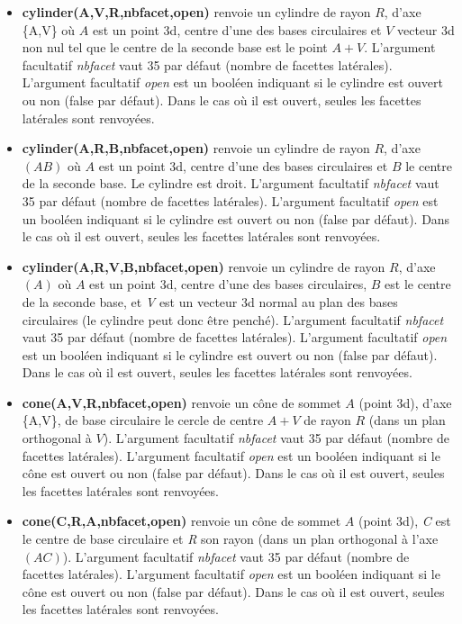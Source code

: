 \begin{itemize}
    \item \textbf{cylinder(A,V,R,nbfacet,open)} renvoie un cylindre de rayon $R$, d'axe \{A,V\} où $A$ est un point 3d, centre d'une des bases circulaires et $V$ vecteur 3d non nul tel que le centre de la seconde base est le point $A+V$. L'argument facultatif \emph{nbfacet} vaut 35 par défaut (nombre de facettes latérales). L'argument facultatif \emph{open} est un booléen indiquant si le cylindre est ouvert ou non (false par défaut). Dans le cas où il est ouvert, seules les facettes latérales sont renvoyées.
    
    \item \textbf{cylinder(A,R,B,nbfacet,open)} renvoie un cylindre de rayon $R$, d'axe $(AB)$ où $A$ est un point 3d, centre d'une des bases circulaires et $B$ le centre de la seconde base. Le cylindre est droit. L'argument facultatif \emph{nbfacet} vaut 35 par défaut (nombre de facettes latérales). L'argument facultatif \emph{open} est un booléen indiquant si le cylindre est ouvert ou non (false par défaut). Dans le cas où il est ouvert, seules les facettes latérales sont renvoyées.
    
   \item \textbf{cylinder(A,R,V,B,nbfacet,open)} renvoie un cylindre de rayon $R$, d'axe $(A)$ où $A$ est un point 3d, centre d'une des bases circulaires, $B$ est le centre de la seconde base, et \emph{V} est un vecteur 3d normal au plan des bases circulaires (le cylindre peut donc être penché). L'argument facultatif \emph{nbfacet} vaut 35 par défaut (nombre de facettes latérales). L'argument facultatif \emph{open} est un booléen indiquant si le cylindre est ouvert ou non (false par défaut). Dans le cas où il est ouvert, seules les facettes latérales sont renvoyées.
    
    \item \textbf{cone(A,V,R,nbfacet,open)} renvoie un cône de sommet $A$ (point 3d), d'axe \{A,V\}, de base circulaire le cercle de centre $A+V$ de rayon $R$ (dans un plan orthogonal à $V$). L'argument facultatif \emph{nbfacet} vaut 35 par défaut (nombre de facettes latérales). L'argument facultatif \emph{open} est un booléen indiquant si le cône est ouvert ou non (false par défaut). Dans le cas où il est ouvert, seules les facettes latérales sont renvoyées.

    \item \textbf{cone(C,R,A,nbfacet,open)} renvoie un cône de sommet $A$ (point 3d), \emph{C} est le centre de base circulaire et \emph{R} son rayon (dans un plan orthogonal à l'axe $(AC)$). L'argument facultatif \emph{nbfacet} vaut 35 par défaut (nombre de facettes latérales). L'argument facultatif \emph{open} est un booléen indiquant si le cône est ouvert ou non (false par défaut). Dans le cas où il est ouvert, seules les facettes latérales sont renvoyées.    
    

\end{itemize}

